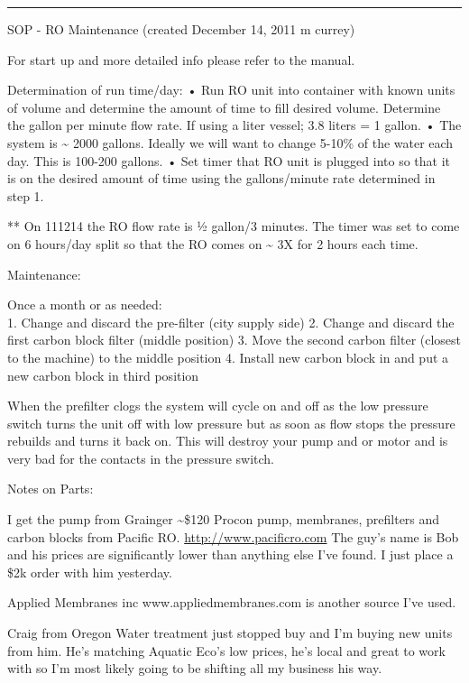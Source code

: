 \documentclass[
]{book}
\begin{document}
\begin{center}\rule{0.5\linewidth}{0.5pt}\end{center}

SOP - RO Maintenance
(created December 14, 2011 m currey)

For start up and more detailed info please refer to the manual.

Determination of run time/day:
• Run RO unit into container with known units of volume and determine the amount of time to fill desired volume. Determine the gallon per minute flow rate. If using a liter vessel; 3.8 liters = 1 gallon.
• The system is \textasciitilde{} 2000 gallons. Ideally we will want to change 5-10\% of the water each day. This is 100-200 gallons.
• Set timer that RO unit is plugged into so that it is on the desired amount of time using the gallons/minute rate determined in step 1.

** On 111214 the RO flow rate is ½ gallon/3 minutes. The timer was set to come on 6 hours/day split so that the RO comes on \textasciitilde{} 3X for 2 hours each time.

Maintenance:

Once a month or as needed:\\
1. Change and discard the pre-filter (city supply side)
2. Change and discard the first carbon block filter (middle position)
3. Move the second carbon filter (closest to the machine) to the middle position
4. Install new carbon block in and put a new carbon block in third position

When the prefilter clogs the system will cycle on and off as the low pressure switch turns the unit off with low pressure but as soon as flow stops the pressure rebuilds and turns it back on. This will destroy your pump and or motor and is very bad for the contacts in the pressure switch.

Notes on Parts:

I get the pump from Grainger \textasciitilde\$120
Procon pump, membranes, prefilters and carbon blocks from Pacific RO. \url{http://www.pacificro.com} The guy's name is Bob and his prices are significantly lower than anything else I've found. I just place a \$2k order with him yesterday.

Applied Membranes inc www.appliedmembranes.com is another source I've used.

Craig from Oregon Water treatment just stopped buy and I'm buying new units from him. He's matching Aquatic Eco's low prices, he's local and great to work with so I'm most likely going to be shifting all my business his way.
\end{document}
